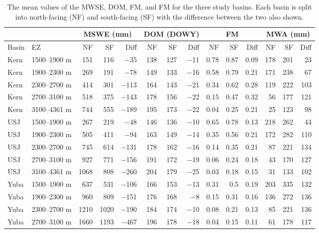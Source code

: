 \begin{table}[htbp]
\centering
\caption{The mean values of the MWSE, DOM, FM, and FM for the three study basins. Each basin is split into north-facing (NF) and south-facing (SF) with the difference between the two also shown.}
\label{tab:snow_metric_table}
\tiny %
\begin{tabular}{llrrrrrrrrrrrr}
\toprule
& & \multicolumn{3}{c}{MSWE (mm)} & \multicolumn{3}{c}{DOM (DOWY)} & \multicolumn{3}{c}{FM} & \multicolumn{3}{c}{MWA (mm)} \\
\midrule
Basin & EZ & NF & SF & Diff & NF & SF & Diff & NF & SF & Diff & NF & SF & Diff \\
\midrule
Kern & 1500--1900 m & 151 & 116 & $-$35 & 138 & 127 & $-$11 & 0.78 & 0.87 & 0.09 & 178 & 201 & 23 \\
Kern & 1900--2300 m & 269 & 191 & $-$78 & 149 & 133 & $-$16 & 0.58 & 0.79 & 0.21 & 171 & 238 & 67 \\
Kern & 2300--2700 m & 414 & 301 & $-$113 & 164 & 143 & $-$21 & 0.34 & 0.62 & 0.28 & 119 & 222 & 103 \\
Kern & 2700--3100 m & 518 & 375 & $-$143 & 178 & 156 & $-$22 & 0.15 & 0.47 & 0.32 & 56 & 177 & 121 \\
Kern & 3100--4361 m & 744 & 555 & $-$189 & 195 & 173 & $-$22 & 0.04 & 0.25 & 0.21 & 25 & 123 & 98 \\
USJ & 1500--1900 m & 267 & 219 & $-$48 & 146 & 136 & $-$10 & 0.65 & 0.78 & 0.13 & 218 & 262 & 44 \\
USJ & 1900--2300 m & 505 & 411 & $-$94 & 163 & 149 & $-$14 & 0.35 & 0.56 & 0.21 & 172 & 282 & 110 \\
USJ & 2300--2700 m & 745 & 614 & $-$131 & 178 & 162 & $-$16 & 0.14 & 0.35 & 0.21 & 87 & 221 & 134 \\
USJ & 2700--3100 m & 927 & 771 & $-$156 & 191 & 172 & $-$19 & 0.06 & 0.24 & 0.18 & 43 & 170 & 127 \\
USJ & 3100--4361 m & 1068 & 808 & $-$260 & 204 & 179 & $-$25 & 0.03 & 0.18 & 0.15 & 31 & 133 & 102 \\
Yuba & 1500--1900 m & 637 & 531 & $-$106 & 166 & 153 & $-$13 & 0.31 & 0.5 & 0.19 & 203 & 335 & 132 \\
Yuba & 1900--2300 m & 960 & 809 & $-$151 & 176 & 168 & $-$8 & 0.15 & 0.31 & 0.16 & 136 & 272 & 136 \\
Yuba & 2300--2700 m & 1210 & 1020 & $-$190 & 184 & 174 & $-$10 & 0.08 & 0.21 & 0.13 & 85 & 221 & 136 \\
Yuba & 2700--3100 m & 1660 & 1193 & $-$467 & 196 & 178 & $-$18 & 0.04 & 0.15 & 0.11 & 61 & 178 & 117 \\
\bottomrule
\end{tabular}
\end{table}


